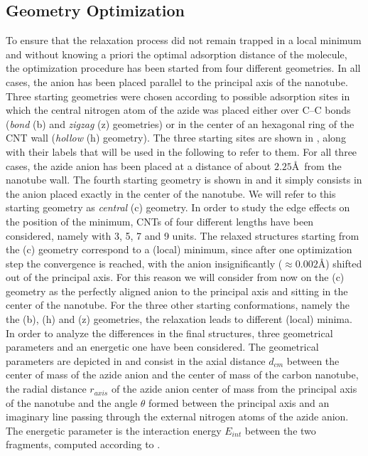 \documentclass[utf8]{article}
\begin{document}
\subsection{Geometry Optimization}
To ensure that the relaxation process did not remain trapped in a local minimum and without knowing a priori the optimal adsorption distance of the \ntm molecule, the optimization procedure has been started from four different geometries.
In all cases, the anion has been placed parallel to the principal axis of the nanotube.
Three starting geometries were chosen according to possible adsorption sites in which the central nitrogen atom of the azide was placed either over C--C bonds (\textit{bond} (b) and \textit{zigzag} (z) geometries) or in the center of an hexagonal ring of the CNT wall (\textit{hollow} (h) geometry). The three starting sites are shown in , along with their labels that will be used in the following to refer to them. For all three cases, the azide anion has been placed at a distance of about $2.25$\AA\ from the nanotube wall.
The fourth starting geometry is shown in  and it simply consists in the \ntm anion placed exactly in the center of the nanotube. We will refer to this starting geometry as \textit{central} (c) geometry.
In order to study the edge effects on the position of the minimum, CNTs of four different lengths have been considered, namely with 3, 5, 7 and 9 units.
The relaxed structures starting from the (c) geometry correspond to a (local) minimum, since after one optimization step the convergence is reached, with the \ntm anion insignificantly ($\approx 0.002$\AA) shifted out of the principal axis. For this reason we will consider from now on the (c) geometry as the perfectly aligned anion to the principal axis and sitting in the center of the nanotube.
For the three other starting conformations, namely the the (b), (h) and (z) geometries, the relaxation leads to different (local) minima.
In order to analyze the differences in the final structures, three geometrical parameters and an energetic one have been considered.
The geometrical parameters are depicted in  and consist in the axial distance $d_{cm}$ between the center of mass of the azide anion and the center of mass of the carbon nanotube, the radial distance $r_{axis}$ of the azide anion center of mass from the principal axis of the nanotube and the angle $\theta$ formed between the principal axis and an imaginary line passing through the external nitrogen atoms of the azide anion.
The energetic parameter is the interaction energy $E_{int}$ between the two fragments, computed according to .\\
\end{document}

